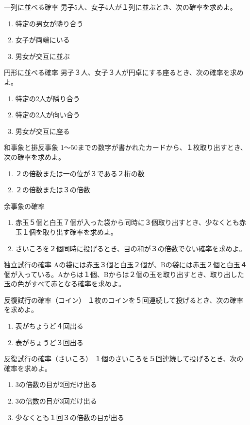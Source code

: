 \documentclass[10pt,dvipdfmx]{jsarticle}
\begin{document}
\begin{itembox}[l]{一列に並べる確率}
  男子5人、女子4人が１列に並ぶとき、次の確率を求めよ。
  \begin{enumerate}
    \item 特定の男女が隣り合う
    \item 女子が両端にいる
    \item 男女が交互に並ぶ
  \end{enumerate}
\end{itembox}
\begin{itembox}[l]{円形に並べる確率}
  男子３人、女子３人が円卓にする座るとき、次の確率を求めよ。
  \begin{enumerate}
    \item 特定の2人が隣り合う
    \item 特定の2人が向い合う
    \item 男女が交互に座る
  \end{enumerate}
\end{itembox}
\begin{itembox}[l]{和事象と排反事象}
  1～50までの数字が書かれたカードから、１枚取り出すとき、次の確率を求めよ。
  \begin{enumerate}
    \item ２の倍数または一の位が３である２桁の数
    \item ２の倍数または３の倍数
  \end{enumerate}
\end{itembox}
\begin{itembox}[l]{余事象の確率}
  \begin{enumerate}
    \item 赤玉５個と白玉７個が入った袋から同時に３個取り出すとき、少なくとも赤玉１個を取り出す確率を求めよ。
    \item さいころを２個同時に投げるとき、目の和が３の倍数でない確率を求めよ。
  \end{enumerate}
\end{itembox}
\begin{itembox}[l]{独立試行の確率}
  Aの袋には赤玉３個と白玉２個が、Bの袋には赤玉２個と白玉４個が入っている。Aからは１個、Bからは２個の玉を取り出すとき、取り出した玉の色がすべて赤となる確率を求めよ。
\end{itembox}
\begin{itembox}[l]{反復試行の確率（コイン）}
  １枚のコインを５回連続して投げるとき、次の確率を求めよ。
  \begin{enumerate}
    \item 表がちょうど４回出る
    \item 表がちょうど３回出る
  \end{enumerate}
\end{itembox}
\begin{itembox}[l]{反復試行の確率（さいころ）}
  １個のさいころを５回連続して投げるとき、次の確率を求めよ。
  \begin{enumerate}
    \item 3の倍数の目が2回だけ出る
    \item 3の倍数の目が3回だけ出る
    \item 少なくとも１回３の倍数の目が出る
  \end{enumerate}
\end{itembox}
\end{document}
